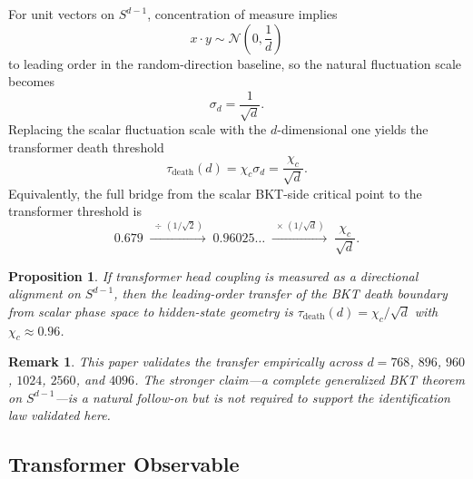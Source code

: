 \documentclass[aps,prd,onecolumn,superscriptaddress,showpacs,12pt]{revtex4-2}
\newcommand{\taudeath}{\tau_{\mathrm{death}}}
\newcommand{\chic}{\chi_c}
\newcommand{\sigmad}{\sigma_d}
\newtheorem{proposition}{Proposition}[section]
\newtheorem{remark}{Remark}[section]
\begin{document}
For unit vectors on $S^{d-1}$, concentration of measure implies
\begin{equation}
x \cdot y \sim \mathcal{N}\!\left(0,\frac{1}{d}\right)
\end{equation}
to leading order in the random-direction baseline, so the natural fluctuation scale
becomes \cite{Vershynin2018}
\begin{equation}
\sigmad=\frac{1}{\sqrt{d}}.
\end{equation}
Replacing the scalar fluctuation scale with the $d$-dimensional one yields the
transformer death threshold
\begin{equation}
\boxed{\taudeath(d)=\chic \sigmad = \frac{\chic}{\sqrt{d}}.}
\end{equation}
Equivalently, the full bridge from the scalar BKT-side critical point to the
transformer threshold is
\begin{equation}
0.679
\;\xrightarrow{\;\div\, (1/\sqrt{2})\;}\;
0.96025\ldots
\;\xrightarrow{\;\times\, (1/\sqrt{d})\;}\;
\frac{\chic}{\sqrt{d}}.
\end{equation}

\begin{proposition}
If transformer head coupling is measured as a directional alignment on $S^{d-1}$,
then the leading-order transfer of the BKT death boundary from scalar phase space
to hidden-state geometry is $\taudeath(d)=\chic/\sqrt{d}$ with $\chic \approx 0.96$.
\end{proposition}

\begin{remark}
This paper validates the transfer empirically across $d=768$, $896$, $960$,
$1024$, $2560$, and $4096$. The stronger claim---a complete generalized BKT
theorem on $S^{d-1}$---is a natural follow-on but is not required to support
the identification law validated here.
\end{remark}

\subsection{Transformer Observable}
\end{document}
